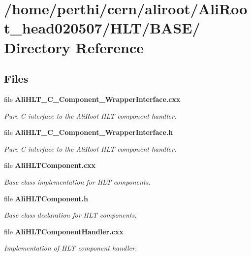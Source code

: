\section{/home/perthi/cern/aliroot/Ali\-Root\_\-head020507/HLT/BASE/ Directory Reference}
\label{dir_000000}


\subsection*{Files}
\begin{CompactItemize}
\item 
file {\bf Ali\-HLT\_\-C\_\-Component\_\-Wrapper\-Interface.cxx}
\begin{CompactList}\small\item\em Pure C interface to the Ali\-Root HLT component handler. \item\end{CompactList}

\item 
file {\bf Ali\-HLT\_\-C\_\-Component\_\-Wrapper\-Interface.h}
\begin{CompactList}\small\item\em Pure C interface to the Ali\-Root HLT component handler. \item\end{CompactList}

\item 
file {\bf Ali\-HLTComponent.cxx}
\begin{CompactList}\small\item\em Base class implementation for HLT components. \item\end{CompactList}

\item 
file {\bf Ali\-HLTComponent.h}
\begin{CompactList}\small\item\em Base class declaration for HLT components. \item\end{CompactList}

\item 
file {\bf Ali\-HLTComponent\-Handler.cxx}
\begin{CompactList}\small\item\em Implementation of HLT component handler. \item\end{CompactList}


\end{CompactItemize}

